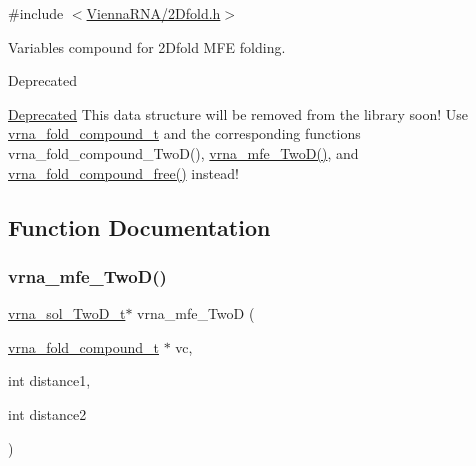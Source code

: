 {\ttfamily \#include $<$\hyperlink{2Dfold_8h}{Vienna\+R\+N\+A/2\+Dfold.\+h}$>$}



Variables compound for 2\+Dfold M\+FE folding. 

\begin{DoxyRefDesc}{Deprecated}
\item[\hyperlink{deprecated__deprecated000001}{Deprecated}]This data structure will be removed from the library soon! Use \hyperlink{group__fold__compound_ga1b0cef17fd40466cef5968eaeeff6166}{vrna\+\_\+fold\+\_\+compound\+\_\+t} and the corresponding functions vrna\+\_\+fold\+\_\+compound\+\_\+\+Two\+D(), \hyperlink{group__kl__neighborhood__mfe_ga243c288b463147352829df04de6a2f77}{vrna\+\_\+mfe\+\_\+\+Two\+D()}, and \hyperlink{group__fold__compound_ga576a077b418a9c3650e06f8e5d296fc2}{vrna\+\_\+fold\+\_\+compound\+\_\+free()} instead! \end{DoxyRefDesc}


\subsection{Function Documentation}
\mbox{\label{group__kl__neighborhood__mfe_ga243c288b463147352829df04de6a2f77}} 
\subsubsection{\texorpdfstring{vrna\+\_\+mfe\+\_\+\+Two\+D()}{vrna\_mfe\_TwoD()}}
{\footnotesize\ttfamily \hyperlink{group__kl__neighborhood__mfe_structvrna__sol__TwoD__t}{vrna\+\_\+sol\+\_\+\+Two\+D\+\_\+t}$\ast$ vrna\+\_\+mfe\+\_\+\+TwoD (\begin{DoxyParamCaption}\item[{\hyperlink{group__fold__compound_ga1b0cef17fd40466cef5968eaeeff6166}{vrna\+\_\+fold\+\_\+compound\+\_\+t} $\ast$}]{vc,  }\item[{int}]{distance1,  }\item[{int}]{distance2 }\end{DoxyParamCaption})}



